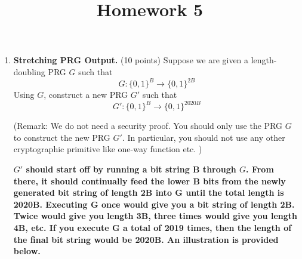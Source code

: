\documentclass[11pt]{article}
\begin{document}
\title{Homework 5}

\date{}

\maketitle 

\thispagestyle{fancy}  
\pagestyle{fancy}      




\begin{enumerate}



\item {\bfseries Stretching PRG Output.} (10 points)
Suppose we are given a length-doubling PRG $G$ such that 
$$G:\{0,1\}^B \rightarrow \{0,1\}^{2B}$$
Using $G$, construct a new PRG $G'$ such that 
$$G': \{0,1\}^B \rightarrow \{0,1\}^{2020B}$$

({\footnotesize Remark: We do not need a security proof. 
You should only use the PRG $G$ to construct the new PRG $G'$. 
In particular, you should not use any other cryptographic primitive like one-way function etc.}%
)

    {\bfseries
      $G'$ should start off by running a bit string B through $G$. From there, it should continually feed the lower B bits from the newly generated bit string of length 2B into G until the total length is 2020B. Executing G once would give you a bit string of length 2B. Twice would give you length 3B, three times would give you length 4B, etc. If you execute G a total of 2019 times, then the length of the final bit string would be 2020B. An illustration is provided below. \newline


\begin{tikzpicture}[x=0.75pt,y=0.75pt,yscale=-1,xscale=1]


\end{tikzpicture}}
\end{enumerate}
\end{document}
